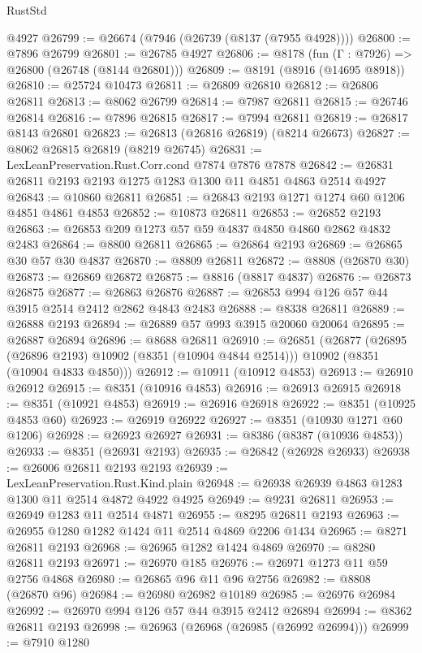 \begin{lexlean}{RustStd}
\begin{coremodule}
    @4927
@26799 := @26674 (@7946 (@26739 (@8137 (@7955 @4928))))
@26800 := @7896 @26799
@26801 := @26785 @4927
@26806 := @8178 (fun (Γ : @7926) => @26800 (@26748 (@8144 @26801)))
@26809 := @8191 (@8916 (@14695 @8918))
@26810 := @25724 @10473
@26811 := @26809 @26810
@26812 := @26806 @26811
@26813 := @8062 @26799
@26814 := @7987 @26811
@26815 := @26746 @26814
@26816 := @7896 @26815
@26817 := @7994 @26811
@26819 := @26817 @8143 @26801
@26823 := @26813 (@26816 @26819) (@8214 @26673)
@26827 := @8062 @26815 @26819 (@8219 @26745)
@26831 := LexLeanPreservation.Rust.Corr.cond @7874 @7876 @7878
@26842 := @26831 @26811 @2193 @2193 @1275 @1283 @1300 @11 @4851 @4863 @2514 @4927
@26843 := @10860 @26811
@26851 := @26843 @2193 @1271 @1274 @60 @1206 @4851 @4861 @4853
@26852 := @10873 @26811
@26853 := @26852 @2193
@26863 := @26853 @209 @1273 @57 @59 @4837 @4850 @4860 @2862 @4832 @2483
@26864 := @8800 @26811
@26865 := @26864 @2193
@26869 := @26865 @30 @57 @30 @4837
@26870 := @8809 @26811
@26872 := @8808 (@26870 @30)
@26873 := @26869 @26872
@26875 := @8816 (@8817 @4837)
@26876 := @26873 @26875
@26877 := @26863 @26876
@26887 := @26853 @994 @126 @57 @44 @3915 @2514 @2412 @2862 @4843 @2483
@26888 := @8338 @26811
@26889 := @26888 @2193
@26894 := @26889 @57 @993 @3915 @20060 @20064
@26895 := @26887 @26894
@26896 := @8688 @26811
@26910 := @26851
    (@26877
      (@26895 (@26896 @2193) @10902 (@8351 (@10904 @4844 @2514)))
      @10902
      (@8351 (@10904 @4833 @4850)))
@26912 := @10911 (@10912 @4853)
@26913 := @26910 @26912
@26915 := @8351 (@10916 @4853)
@26916 := @26913 @26915
@26918 := @8351 (@10921 @4853)
@26919 := @26916 @26918
@26922 := @8351 (@10925 @4853 @60)
@26923 := @26919 @26922
@26927 := @8351 (@10930 @1271 @60 @1206)
@26928 := @26923 @26927
@26931 := @8386 (@8387 (@10936 @4853))
@26933 := @8351 (@26931 @2193)
@26935 := @26842 (@26928 @26933)
@26938 := @26006 @26811 @2193 @2193
@26939 := LexLeanPreservation.Rust.Kind.plain
@26948 := @26938 @26939 @4863 @1283 @1300 @11 @2514 @4872 @4922 @4925
@26949 := @9231 @26811
@26953 := @26949 @1283 @11 @2514 @4871
@26955 := @8295 @26811 @2193
@26963 := @26955 @1280 @1282 @1424 @11 @2514 @4869 @2206 @1434
@26965 := @8271 @26811 @2193
@26968 := @26965 @1282 @1424 @4869
@26970 := @8280 @26811 @2193
@26971 := @26970 @185
@26976 := @26971 @1273 @11 @59 @2756 @4868
@26980 := @26865 @96 @11 @96 @2756
@26982 := @8808 (@26870 @96)
@26984 := @26980 @26982 @10189
@26985 := @26976 @26984
@26992 := @26970 @994 @126 @57 @44 @3915 @2412 @26894
@26994 := @8362 @26811 @2193
@26998 := @26963 (@26968 (@26985 (@26992 @26994)))
@26999 := @7910 @1280

\end{coremodule}
\end{lexlean}

